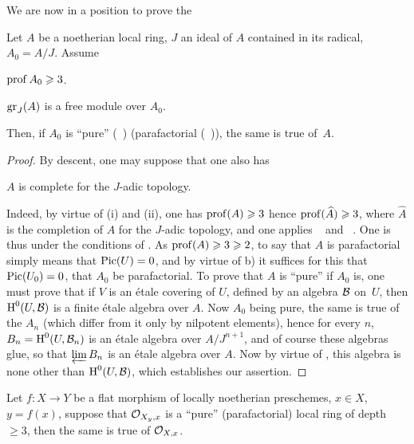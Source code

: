 We are now in a position to prove the
%
\begin{theorem} \label{XII.4.7}
Let $A$ be a noetherian local ring, $J$ an ideal of $A$ contained in its radical, $A_0=A/J$. Assume
\begin{enumeratei}
\item
$\operatorname{prof} A_0\geqslant 3$.
\item
$\operatorname{gr}_J(A)$ is a free module over $A_0$.
\end{enumeratei}
\noindent
Then, if $A_0$ is ``pure'' (~) (\resp parafactorial (~)), the same is true of~$A$.
\end{theorem}

\begin{proof}
By descent, one may suppose that one also has
\begin{enumeratei}\setcounter{enumi}{2}
\item
$A$ is complete for the $J$-adic topology.
\end{enumeratei}

Indeed, by virtue of (i) and (ii), one has $\operatorname{prof}(A)\geqslant 3$ hence $\operatorname{prof}(\widehat{A})\geqslant 3$, where $\widehat{A}$ is the completion of $A$ for the $J$-adic topology, and one applies ~ and ~. One is thus under the conditions of . As $\operatorname{prof}(A)\geqslant 3\geqslant 2$, to say that $A$ is parafactorial simply means that $\operatorname{Pic}(U)=0$, and by virtue of  b) it suffices for this that $\operatorname{Pic}(U_0)=0$, \ie that $A_0$ be parafactorial. To prove that $A$ is ``pure'' if $A_0$ is, one must prove that if $V$ is an \'etale covering of $U$, defined by an algebra ${\mathcal B}$ on~$U$, then $\operatorname{H}^0(U, {\mathcal B})$ is a finite \'etale algebra over $A$. Now $A_0$ being pure, the same is true of the $A_n$ (which differ from it only by nilpotent elements), hence for every $n$, $B_n=\operatorname{H}^0(U, {\mathcal B}_n)$ is an \'etale algebra over $A/J^{n+1}$, and of course these algebras glue, so that $\varprojlim B_n$ is an \'etale algebra over $A$. Now by virtue of , this algebra is none other than $\operatorname{H}^0(U, {\mathcal B})$, which establishes our assertion.
\skipqed
\end{proof}

\begin{corollary} \label{XII.4.8}
Let $f\colon X\to Y$ be a flat morphism of locally noetherian preschemes, $x\in X$, $y=f(x)$, suppose that ${\mathcal O}_{X_y, x}$ is a ``pure'' (\resp parafactorial) local ring of depth $\geq 3$, then the same is true of ${\mathcal O}_{X, x}$.
\end{corollary}

